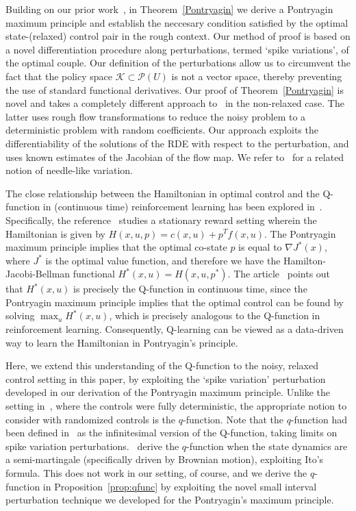 \documentclass[12pt,reqno]{amsart}
\numberwithin{equation}{section}  %
\newcommand{\1}{{\bf 1}}
\newcommand{\2}{{\bf 2}}
\theoremstyle{remark}
\theoremstyle{remark}
\begin{document}
Building on our prior work~\cite{CHT}, in Theorem~\ref{Pontryagin} we derive a Pontryagin maximum principle and establish the neccesary condition satisfied by the optimal state-(relaxed) control pair in the rough context. Our method of proof is based on a novel differentiation procedure along perturbations, termed `spike variations', of the optimal couple. Our definition of the perturbations allow us to circumvent the fact that the policy space $\mathcal{K} \subset \mathcal P(U)$ is not a vector space, thereby preventing the use of standard functional derivatives. Our proof of Theorem~\ref{Pontryagin} is novel and takes a completely different approach to~\cite[Theorem 7]{diehl} in the non-relaxed case. The latter uses rough flow transformations to reduce the noisy problem to a deterministic problem with random coefficients. Our approach exploits the differentiability of the solutions of the RDE with respect to the perturbation, and uses known estimates of the Jacobian of the flow map. We refer to~\cite{Lew} for a related notion of needle-like variation.

The close relationship between the Hamiltonian in optimal control and the Q-function in (continuous time) reinforcement learning has been explored in~\cite{MehtaMeyn2009}. Specifically, the reference~\cite{MehtaMeyn2009} studies a stationary reward setting wherein the Hamiltonian is given by $H(x,u,p) = c(x,u) + p^T f(x,u)$. The Pontryagin maximum principle implies that the optimal co-state $p$  is equal to $\nabla J^*(x)$, where $J^*$ is the optimal value function, and therefore we have the Hamilton-Jacobi-Bellman functional $H^*(x,u) = H(x,u,p^*)$. The article~\cite{MehtaMeyn2009} points out that $H^*(x,u)$ is precisely the Q-function in continuous time, since the Pontryagin maximum principle implies that the optimal control can be found by solving $\max_u H^*(x,u)$, which is precisely analogous to the Q-function in reinforcement learning. Consequently, Q-learning can be viewed as a data-driven way to learn the Hamiltonian in Pontryagin's principle. 

Here, we extend this understanding of the Q-function to the noisy, relaxed control setting in this paper, by exploiting the `spike variation' perturbation developed in our derivation of the Pontryagin maximum principle. Unlike the setting in~\cite{MehtaMeyn2009}, where the controls were fully deterministic, the appropriate notion to consider with randomized controls is the $q$-function. Note that the $q$-function had been defined in~\cite{jia2023qlearning} as the infinitesimal version of the Q-function, taking limits on spike variation perturbations.~\cite{jia2023qlearning} derive the $q$-function when the state dynamics are a semi-martingale (specifically driven by Brownian motion), exploiting Ito's formula. This does not work in our setting, of course, and we derive the $q$-function in Proposition~\ref{prop:qfunc} by exploiting the novel small interval perturbation technique we developed for the Pontryagin's maximum principle.
\end{document}
